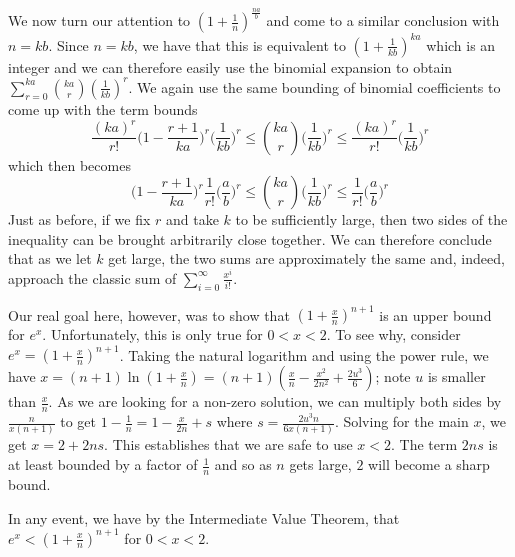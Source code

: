 \documentclass[12pt]{article}
\theoremstyle{remark}
\begin{document}
We now turn our attention to $(1+\frac{1}{n})^{\frac{na}{b}}$ and come to a similar conclusion with $n= kb$. Since $n=kb$, we have  that this is equivalent to $(1+\frac{1}{kb})^{ka}$ which is an integer and we can therefore easily use the binomial expansion to obtain $\sum_{r=0}^{ka} \binom{ka}{r} (\frac{1}{kb})^r$. We again use the same bounding of binomial coefficients to come up with the term bounds
$$\frac{(ka)^r}{r!} \bigg( 1 - \frac{r+1}{ka}\bigg)^r \bigg(\frac{1}{kb}\bigg)^r \leq \binom{ka}{r} \bigg(\frac{1}{kb}\bigg)^r \leq \frac{(ka)^r}{r!} \bigg(\frac{1}{kb}\bigg)^r$$ 
which then becomes
$$\bigg( 1 - \frac{r+1}{ka}\bigg)^r \frac{1}{r!} \bigg(\frac{a}{b}\bigg)^r \leq \binom{ka}{r} \bigg(\frac{1}{kb}\bigg)^r \leq \frac{1}{r!}\bigg(\frac{a}{b}\bigg)^r $$
Just as before, if we fix $r$ and take $k$ to be sufficiently large, then two sides of the inequality can be brought arbitrarily close together. 
We can therefore conclude that as we let $k$ get large, the two sums are approximately the same and, indeed, approach the classic sum of $\sum_{i=0}^\infty \frac{x^i}{i!}$. 

Our real goal here, however, was to show that $(1 + \frac{x}{n})^{n+1}$ is an upper bound for $e^x$. Unfortunately, this is only true for $0 < x < 2$. To see why, consider $e^x = (1+\frac{x}{n})^{n+1}$. Taking the natural logarithm and using the power rule, we have $x = (n+1) \ln (1 + \frac{x}{n} ) = (n+1) (\frac{x}{n} - \frac{x^2}{2n^2} + \frac{2u^3}{6})$; note $u$ is smaller than $\frac{x}{n}$. As we are looking for a non-zero solution, we can multiply both sides by $\frac{n}{x (n+1)}$ to get $1- \frac{1}{n} = 1 - \frac{x}{2n} + s$ where $s = \frac{2u^3 n}{6 x (n+1)}$. Solving for the main $x$, we get $x = 2 + 2n s$. This establishes that we are safe to use $x < 2$. The term $2n s$ is at least bounded by a factor of $\frac{1}{n}$ and so as $n$ gets large, $2$ will become a sharp bound.  

In any event, we have by the Intermediate Value Theorem, that $e^x < (1+\frac{x}{n})^{n+1}$ for $0 < x< 2$. 
\end{document}
